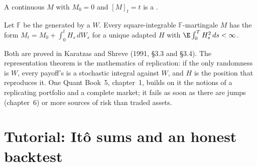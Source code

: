 \begin{theorem}\label{thm:qm:ito-calculus:levy}
A continuous  $M$ with $M_0 = 0$ and $[M]_t = t$ is a .
\end{theorem}

\admitted

\begin{theorem}\label{thm:qm:ito-calculus:representation}
Let $\mathbb F$ be the  generated by a  $W$. Every square-integrable
$\mathbb F$-martingale $M$ has the form $M_t = M_0 + \int_0^tH_s\,dW_s$ for a unique adapted $H$ with
$\E\int_0^TH_s^2\,ds < \infty$.
\end{theorem}

\admitted

Both are proved in Karatzas and Shreve (1991, §3.3 and §3.4). The representation theorem is the
mathematics of replication: if the only randomness is $W$, every payoff's 
is a stochastic integral against $W$, and $H$ is the position that reproduces it. One Quant
Book~5, chapter~1, builds on it the notions of a replicating portfolio and a complete market; it
fails as soon as there are jumps (chapter~6) or more sources of risk than traded assets.

\section{Tutorial: Itô sums and an honest backtest}\label{tut:qm:ito-calculus:backtest}

